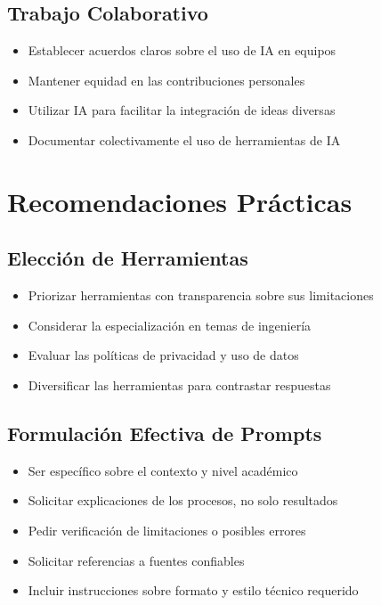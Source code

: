 \documentclass[11pt, letterpaper]{article}
\begin{document}
	\subsection{Trabajo Colaborativo}
	
	\begin{itemize}
		\item Establecer acuerdos claros sobre el uso de IA en equipos
		\item Mantener equidad en las contribuciones personales
		\item Utilizar IA para facilitar la integración de ideas diversas
		\item Documentar colectivamente el uso de herramientas de IA
	\end{itemize}
	
	\section{Recomendaciones Prácticas}
	
	\subsection{Elección de Herramientas}
	
	\begin{itemize}
		\item Priorizar herramientas con transparencia sobre sus limitaciones
		\item Considerar la especialización en temas de ingeniería
		\item Evaluar las políticas de privacidad y uso de datos
		\item Diversificar las herramientas para contrastar respuestas
	\end{itemize}
	
	\subsection{Formulación Efectiva de Prompts}
	
	\begin{itemize}
		\item Ser específico sobre el contexto y nivel académico
		\item Solicitar explicaciones de los procesos, no solo resultados
		\item Pedir verificación de limitaciones o posibles errores
		\item Solicitar referencias a fuentes confiables
		\item Incluir instrucciones sobre formato y estilo técnico requerido
	\end{itemize}
	
\end{document}
